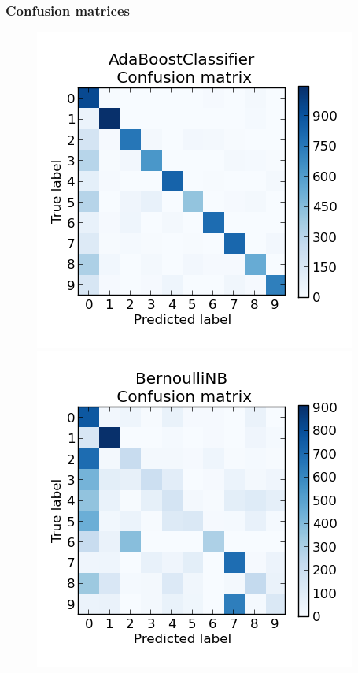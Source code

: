 \documentclass{scrartcl}
\begin{document}
\subsubsection{Confusion matrices}
\begin{figure}[H]
\centering
\begin{minipage}{.5\textwidth}
  \centering
  \includegraphics[width=.8\linewidth]{img/AdaBoostClassifier.png}
\end{minipage}%
\begin{minipage}{.5\textwidth}
  \centering
  \includegraphics[width=.8\linewidth]{img/BernoulliNB.png}

\end{minipage}
\end{figure}
\end{document}
